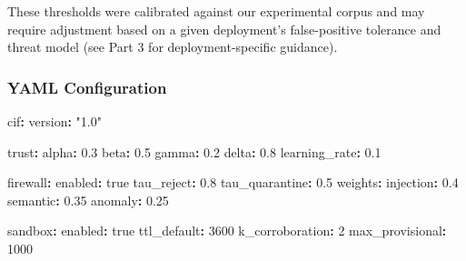 \documentclass[
]{article}
\newenvironment{Shaded}{}{}
\newcommand{\AttributeTok}[1]{\textcolor[rgb]{0.49,0.56,0.16}{#1}}
\newcommand{\CharTok}[1]{\textcolor[rgb]{0.25,0.44,0.63}{#1}}
\newcommand{\DecValTok}[1]{\textcolor[rgb]{0.25,0.63,0.44}{#1}}
\newcommand{\FloatTok}[1]{\textcolor[rgb]{0.25,0.63,0.44}{#1}}
\newcommand{\FunctionTok}[1]{\textcolor[rgb]{0.02,0.16,0.49}{#1}}
\newcommand{\KeywordTok}[1]{\textcolor[rgb]{0.00,0.44,0.13}{\textbf{#1}}}
\newcommand{\StringTok}[1]{\textcolor[rgb]{0.25,0.44,0.63}{#1}}
\begin{document}
These thresholds were calibrated against our experimental corpus and may
require adjustment based on a given deployment's false-positive
tolerance and threat model (see Part 3 for deployment-specific
guidance).

\subsubsection{YAML Configuration}\label{sec:yaml-config}

\begin{Shaded}
\begin{Highlighting}[]
\FunctionTok{cif}\KeywordTok{:}
\AttributeTok{  }\FunctionTok{version}\KeywordTok{:}\AttributeTok{ }\StringTok{"1.0"}

\AttributeTok{  }\FunctionTok{trust}\KeywordTok{:}
\AttributeTok{    }\FunctionTok{alpha}\KeywordTok{:}\AttributeTok{ }\FloatTok{0.3}
\AttributeTok{    }\FunctionTok{beta}\KeywordTok{:}\AttributeTok{ }\FloatTok{0.5}
\AttributeTok{    }\FunctionTok{gamma}\KeywordTok{:}\AttributeTok{ }\FloatTok{0.2}
\AttributeTok{    }\FunctionTok{delta}\KeywordTok{:}\AttributeTok{ }\FloatTok{0.8}
\AttributeTok{    }\FunctionTok{learning\_rate}\KeywordTok{:}\AttributeTok{ }\FloatTok{0.1}

\AttributeTok{  }\FunctionTok{firewall}\KeywordTok{:}
\AttributeTok{    }\FunctionTok{enabled}\KeywordTok{:}\AttributeTok{ }\CharTok{true}
\AttributeTok{    }\FunctionTok{tau\_reject}\KeywordTok{:}\AttributeTok{ }\FloatTok{0.8}
\AttributeTok{    }\FunctionTok{tau\_quarantine}\KeywordTok{:}\AttributeTok{ }\FloatTok{0.5}
\AttributeTok{    }\FunctionTok{weights}\KeywordTok{:}
\AttributeTok{      }\FunctionTok{injection}\KeywordTok{:}\AttributeTok{ }\FloatTok{0.4}
\AttributeTok{      }\FunctionTok{semantic}\KeywordTok{:}\AttributeTok{ }\FloatTok{0.35}
\AttributeTok{      }\FunctionTok{anomaly}\KeywordTok{:}\AttributeTok{ }\FloatTok{0.25}

\AttributeTok{  }\FunctionTok{sandbox}\KeywordTok{:}
\AttributeTok{    }\FunctionTok{enabled}\KeywordTok{:}\AttributeTok{ }\CharTok{true}
\AttributeTok{    }\FunctionTok{ttl\_default}\KeywordTok{:}\AttributeTok{ }\DecValTok{3600}
\AttributeTok{    }\FunctionTok{k\_corroboration}\KeywordTok{:}\AttributeTok{ }\DecValTok{2}
\AttributeTok{    }\FunctionTok{max\_provisional}\KeywordTok{:}\AttributeTok{ }\DecValTok{1000}


\end{Highlighting}
\end{Shaded}
\end{document}
